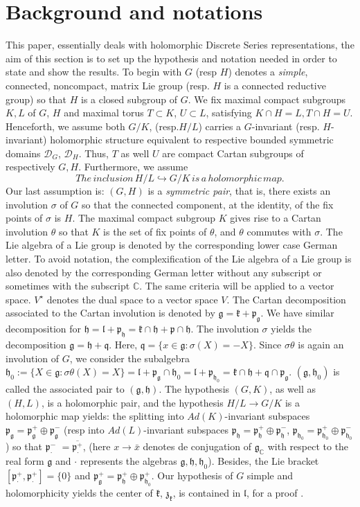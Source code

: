 \documentclass[12pt]{amsart}
\theoremstyle{definition}
\theoremstyle{remark}
\newcommand{\g}{\mathfrak{g}}
\newcommand{\h}{\mathfrak{h}}
\renewcommand{\k}{{\mathfrak k}}
\renewcommand{\l}{\mathfrak l}
\newcommand{\p}{\mathfrak p}
\newcommand{\q}{\mathfrak q}
\newcommand{\z}{\mathfrak z}
\newcommand{\C}{{\mathbb C}}
\numberwithin{equation}{section}
\begin{document}
\section{Background and notations}\label{sec:notation} This paper, essentially deals with holomorphic Discrete Series representations, the aim of this section is to set up the hypothesis and notation needed in order to state and show the results. To begin with $G$ (resp $H$) denotes a {\it simple},  connected, noncompact, matrix Lie group (resp. $H$ is a connected reductive group) so that $H$ is a closed subgroup of $G$. We fix maximal compact subgroups $K,L$ of $G$, $H$  and maximal torus $T\subset K$, $U\subset L$,  satisfying $K\cap H=L, T\cap H=U$. Henceforth, we assume both $G/K$, (resp.$ H/L$) carries a $G$-invariant (resp. $H$-invariant) holomorphic structure equivalent to respective bounded symmetric domains $\mathcal D_G$,   $\mathcal D_H$. Thus, $T$ as well $U$ are compact Cartan subgroups of respectively $G,H$. Furthermore, we assume
$$ The \, inclusion \, H/L \hookrightarrow G/K \, is \,a \,holomorphic\, map.$$
Our last   assumption is: $(G,H)$ is a {\it symmetric pair}, that is, there exists an involution $\sigma$ of $G$ so that the connected component, at the identity, of the fix points of $\sigma$ is $H$. The maximal compact subgroup $K$ gives rise to a Cartan involution $\theta$ so that $K$ is the set of fix points of $\theta$,  and $\theta$ commutes with $\sigma$. The Lie algebra of a Lie group is  denoted by the corresponding lower case German letter.  To avoid notation, the complexification of  the Lie algebra of a Lie group is  also denoted by the corresponding German letter without any subscript or sometimes with the subscript $\C$.  The same criteria will be applied to a vector space.     $V^\star $ denotes the dual space to a vector space $V.$ The Cartan decomposition associated to the Cartan involution  is denoted by $\mathfrak g=\mathfrak k +\mathfrak p_\g.$   We have similar decomposition for $\h=\mathfrak l +\p_\h=\k \cap \h + \p \cap \h$. The involution $\sigma$ yields the decomposition $\g=\h+\q$. Here, $\q=\{ x \in \g : \sigma(X)=-X\}$. Since $\sigma \theta$ is again an involution of $G$, we consider the subalgebra $\h_0 :=\{X \in \g: \sigma \theta(X)=X  \}= \l +\p_\g \cap \h_0=\l +\p_{\h_0}=\k \cap \h + \q \cap \p_\g$. $(\g, \h_0)$ is called the associated pair to $(\g, \h)$. The hypothesis $(G,K)$, as well as $(H,L)$, is a holomorphic pair, and the hypothesis $H/L \rightarrow G/K$ is a holomorphic map   yields:  the splitting  into $Ad(K)$-invariant subspaces $\p_\g= \p_\g^+ \oplus \p_\g^-$  (resp  into $Ad(L)$-invariant subspaces $\p_\h= \p_\h^+ \oplus \p_\h^-$, $\p_{\h_0}= \p_{\h_0}^+ \oplus \p_{\h_0}^-$) so that
$\p_\cdot^-$ $ =\overline{\p_\cdot^+}    $, (here $ x \rightarrow \bar{x}$ denotes de conjugation of $\g_\C$ with respect to the real form $\g$ and $\cdot$ represents the algebras $\g, \h, \h_0$). Besides, the Lie bracket $[\p_\cdot^+, \p_\cdot^+]=\{0\}$ and $\p_\g^+= \p_\h^+ \oplus \p_{\h_0}^+$. Our hypothesis of $G$ simple and holomorphicity yields the center of $\k$, $\z_\k$, is contained in $\l$, for a proof \cite[3.6, Table 3.6.1]{Kob9}.
\end{document}
